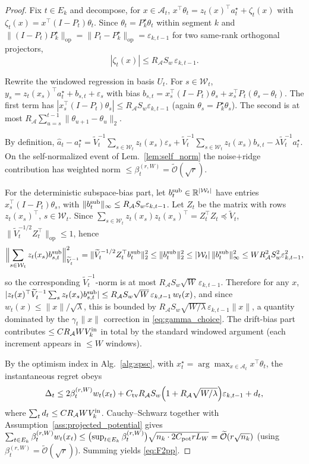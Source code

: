 \documentclass{article}
\newcommand{\R}{\mathbb{R}}
\newcommand{\op}{\mathrm{op}}
\newcommand{\cA}{\mathcal{A}}
\newcommand{\cW}{\mathcal{W}}
\newcommand{\tilO}{\widetilde{\mathcal{O}}}
\begin{document}
\begin{proof}
Fix $t\in E_k$ and decompose, for $x\in\cA_t$,
$x^\top\theta_t = z_t(x)^\top a_t^\star + \zeta_t(x)$ with
$\zeta_t(x)=x^\top(I-P_t)\theta_t$. Since $\theta_t=P_k^\star\theta_t$
within segment $k$ and $\|(I-P_t)P_k^\star\|_{\op}=\|P_t-P_k^\star\|_{\op}=\varepsilon_{k,t-1}$
for two same-rank orthogonal projectors,
\begin{equation}|\zeta_t(x)|\le R_\cA S_w\,\varepsilon_{k,t-1}.\label{eq:zeta}\end{equation}

Rewrite the windowed regression in basis $U_t$. For $s\in\cW_t$,
$y_s=z_t(x_s)^\top a_t^\star+b_{s,t}+\varepsilon_s$ with bias
$b_{s,t}=x_s^\top(I-P_t)\theta_s + x_s^\top P_t(\theta_s-\theta_t)$.
The first term has $|x_s^\top(I-P_t)\theta_s|\le R_\cA S_w\varepsilon_{k,t-1}$
(again $\theta_s=P_k^\star\theta_s$). The second is at most
$R_\cA\sum_{u=s}^{t-1}\|\theta_{u+1}-\theta_u\|_2$.

By definition,
$\widehat a_t-a_t^\star
= \widetilde V_t^{-1}\sum_{s\in\cW_t}z_t(x_s)\varepsilon_s
+ \widetilde V_t^{-1}\sum_{s\in\cW_t}z_t(x_s)b_{s,t}
- \lambda\widetilde V_t^{-1}a_t^\star.$
On the self-normalized event of Lem.~\ref{lem:self_norm} the noise+ridge contribution has weighted norm
$\le \beta_t^{(r,W)}=\tilO(\sqrt r)$.

For the deterministic subspace-bias part, let $b_t^{\rm sub}\in\R^{|\cW_t|}$
have entries $x_s^\top(I-P_t)\theta_s$, with
$\|b_t^{\rm sub}\|_\infty\le R_\cA S_w\varepsilon_{k,t-1}$. Let $Z_t$ be
the matrix with rows $z_t(x_s)^\top$, $s\in\cW_t$. Since
$\sum_{s\in\cW_t}z_t(x_s)z_t(x_s)^\top = Z_t^\top Z_t\preceq\widetilde V_t$,
$\|\widetilde V_t^{-1/2}Z_t^\top\|_\op\le 1$, hence
\[
\Bigl\|\sum_{s\in\cW_t}z_t(x_s)b_{s,t}^{\rm sub}\Bigr\|_{\widetilde V_t^{-1}}^2
= \|\widetilde V_t^{-1/2}Z_t^\top b_t^{\rm sub}\|_2^2
\le \|b_t^{\rm sub}\|_2^2 \le |\cW_t|\,\|b_t^{\rm sub}\|_\infty^2
\le W R_\cA^2 S_w^2\varepsilon_{k,t-1}^2,
\]
so the corresponding $\widetilde V_t^{-1}$-norm is at most
$R_\cA S_w\sqrt W\,\varepsilon_{k,t-1}$. Therefore for any $x$,
$|z_t(x)^\top\widetilde V_t^{-1}\sum_s z_t(x_s)b_{s,t}^{\rm sub}|
\le R_\cA S_w\sqrt W\,\varepsilon_{k,t-1}\,w_t(x)$, and since
$w_t(x)\le\|x\|/\sqrt\lambda$, this is bounded by
$R_\cA S_w\sqrt{W/\lambda}\,\varepsilon_{k,t-1}\|x\|$, a quantity
dominated by the $\gamma_t\|x\|$ correction in
\eqref{eq:gamma_choice}.
The drift-bias part contributes $\le C R_\cA W V_k^{\rm in}$ in total
by the standard windowed argument (each increment appears in $\le W$
windows).

By the optimism index in Alg.~\ref{alg:spsc}, with
$x_t^\star=\arg\max_{x\in\cA_t} x^\top\theta_t$, the instantaneous regret obeys
\[
\Delta_t \le 2\beta_t^{(r,W)}w_t(x_t)
+ C_{\rm tv}R_\cA S_w\Bigl(1+R_\cA\sqrt{W/\lambda}\Bigr)\varepsilon_{k,t-1}
+ d_t,
\]
where $\sum_t d_t\le C R_\cA W V_k^{\rm in}$.
Cauchy--Schwarz together with
Assumption~\ref{ass:projected_potential} gives
$\sum_{t\in E_k}\beta_t^{(r,W)}w_t(x_t)
\le \bigl(\sup_{t\in E_k}\beta_t^{(r,W)}\bigr)\sqrt{n_k\cdot 2C_{\rm pot}r L_W}=\tilO(r\sqrt{n_k})$
(using $\beta_t^{(r,W)}=\tilO(\sqrt r)$).
Summing yields \eqref{eq:F2pp}.
\end{proof}
\end{document}

